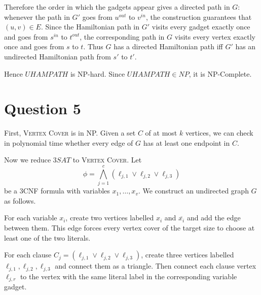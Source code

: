 \documentclass[a4paper, UTF-8]{article}
\theoremstyle{plain}
\begin{document}
Therefore the order in which the gadgets appear gives a directed path in $G$:
whenever the path in $G'$ goes from $u^{out}$ to $v^{in}$, the construction
guarantees that $(u,v)\in E$. Since the Hamiltonian path in $G'$ visits every
gadget exactly once and goes from $s^{in}$ to $t^{out}$, the corresponding path
in $G$ visits every vertex exactly once and goes from $s$ to $t$. Thus $G$ has a
directed Hamiltonian path iff $G'$ has an undirected Hamiltonian path from
$s'$ to $t'$.

Hence $UHAMPATH$ is NP-hard. Since $UHAMPATH\in NP$, it is NP-Complete.

\section{Question 5} 

First, \textsc{Vertex Cover} is in NP. Given a set $C$ of at most $k$ vertices, we can
check in polynomial time whether every edge of $G$ has at least one endpoint in
$C$.

Now we reduce $3SAT$ to \textsc{Vertex Cover}. Let
\[
\phi=\bigwedge_{j=1}^{c}(\ell_{j,1}\vee \ell_{j,2}\vee \ell_{j,3})
\]
be a $3$CNF formula with variables $x_1,\ldots,x_v$. We construct an
undirected graph $G$ as follows.

For each variable $x_i$, create two vertices labelled $x_i$ and $\overline{x_i}$
and add the edge between them. This edge forces every vertex cover of the target
size to choose at least one of the two literals.

\begin{center}
\end{center}

For each clause $C_j=(\ell_{j,1}\vee \ell_{j,2}\vee \ell_{j,3})$, create three
vertices labelled $\ell_{j,1},\ell_{j,2},\ell_{j,3}$ and connect them as a
triangle. Then connect each clause vertex $\ell_{j,r}$ to the vertex with the
same literal label in the corresponding variable gadget.

\begin{center}
\end{center}
\end{document}
